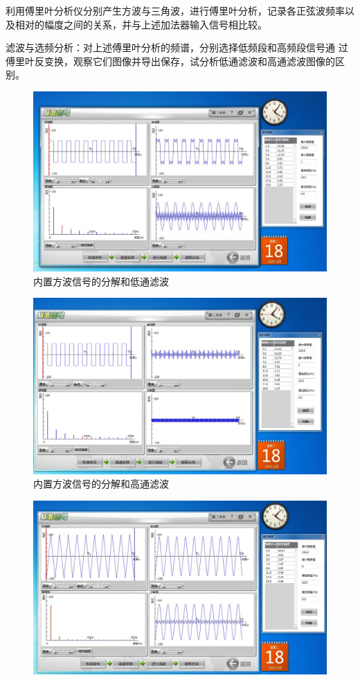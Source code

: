 \documentclass[11pt]{article}
\begin{document}
\begin{enumerate}
    利用傅里叶分析仪分别产生方波与三角波，进行傅里叶分析，记录各正弦波频率以及相对的幅度之间的关系，并与上述加法器输入信号相比较。

    滤波与选频分析：对上述傅里叶分析的频谱，分别选择低频段和高频段信号通
    过傅里叶反变换，观察它们图像并导出保存，试分析低通滤波和高通滤波图像的区别。

    \begin{figure}[H]
        \centering
        \includegraphics[width=15cm]{Fig/图5 内置方波信号的分解和低通滤波.JPG}
        \caption{内置方波信号的分解和低通滤波}
    \end{figure}
    \begin{figure}[H]
        \centering
        \includegraphics[width=15cm]{Fig/图6 内置方波信号的分解和高通滤波.JPG}
        \caption{内置方波信号的分解和高通滤波}
    \end{figure}
    \begin{figure}[H]
        \centering
        \includegraphics[width=15cm]{Fig/图7 内置三角波信号的分解和低通滤波.JPG}

\end{figure}
\end{enumerate}
\end{document}

